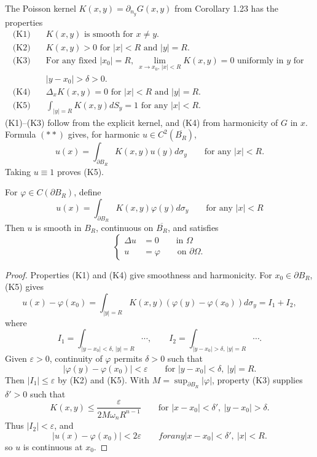 The Poisson kernel $K(x,y)=\partial_{n_y}G(x,y)$ from Corollary 1.23 has the
properties
\begin{align*}
\text{(K1)}\quad &K(x,y) \text{ is smooth for } x\neq y.\\
\text{(K2)}\quad &K(x,y)>0 \text{ for } |x|<R \text{ and } |y|=R.\\
\text{(K3)}\quad &\text{For any fixed } |x_0|=R,\ \lim_{x\to x_0,\,|x|<R}K(x,y)=0 \text{ uniformly in } y \text{ for }\\
&|y-x_0|>\delta>0.\\
\text{(K4)}\quad &\Delta_x K(x,y)=0 \text{ for } |x|<R \text{ and } |y|=R.\\
\text{(K5)}\quad &\int_{|y|=R}K(x,y)dS_y=1 \text{ for any } |x|<R.
\end{align*}
(K1)--(K3) follow from the explicit kernel, and (K4) from harmonicity of $G$ in
$x$. Formula $(**)$ gives, for harmonic $u\in C^2(\overline{B_R})$,
\[
u(x)=\int_{\partial B_R}K(x,y)u(y)d\sigma_y \qquad \text{for any } |x|<R.
\]
Taking $u\equiv1$ proves (K5).

\begin{theorem}\label{hanlin:thm-poisson-dirichlet}
For $\varphi\in C(\partial B_R)$, define
\begin{equation}
u(x)=\int_{\partial B_R}K(x,y)\varphi(y)d\sigma_y \qquad \text{for any } |x|<R
\tag{1}
\end{equation}
Then $u$ is smooth in $B_R$, continuous on $\overline{B_R}$, and satisfies
\[
\left\{
\begin{aligned}
\Delta u &= 0 \qquad \text{in } \Omega\\
u &= \varphi \qquad \text{on } \partial \Omega.
\end{aligned}
\right.
\]
\end{theorem}

\begin{proof}
\sketch Properties (K1) and (K4) give smoothness and harmonicity. For
$x_0\in\partial B_R$, (K5) gives
\[
u(x)-\varphi(x_0)=\int_{|y|=R}K(x,y)(\varphi(y)-\varphi(x_0))d\sigma_y=I_1+I_2,
\]
where
\[
I_1=\int_{|y-x_0|<\delta,\,|y|=R}\cdots,\qquad
I_2=\int_{|y-x_0|>\delta,\,|y|=R}\cdots.
\]
Given $\varepsilon>0$, continuity of $\varphi$ permits $\delta>0$ such that
\[
|\varphi(y)-\varphi(x_0)|<\varepsilon \qquad \text{for } |y-x_0|<\delta,\ |y|=R.
\]
Then $|I_1|\le\varepsilon$ by (K2) and (K5). With
$M=\sup_{\partial B_R}|\varphi|$, property (K3) supplies $\delta'>0$ such that
\[
K(x,y)\le \frac{\varepsilon}{2M\omega_n R^{n-1}} \qquad \text{for } |x-x_0|<\delta',\ |y-x_0|>\delta.
\]
Thus $|I_2|<\varepsilon$, and
\[
|u(x)-\varphi(x_0)|<2\varepsilon \qquad for any |x-x_0|<\delta',\ |x|<R.
\]
so $u$ is continuous at $x_0$.
\end{proof}

